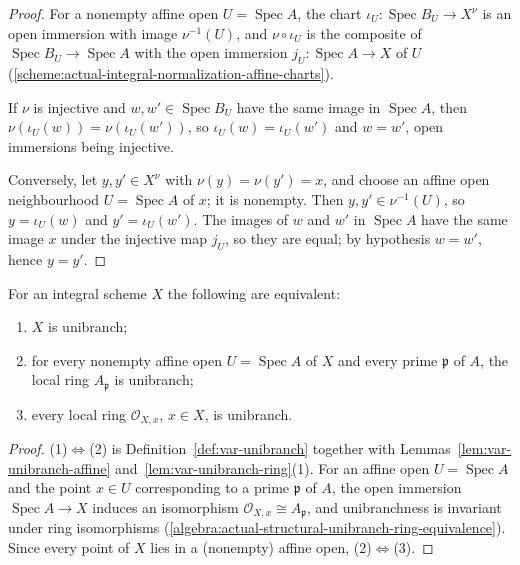 \begin{proof}
For a nonempty affine open $U=\operatorname{Spec}A$, the chart
$\iota_U\colon\operatorname{Spec}B_U\to X^\nu$ is an open immersion with image $\nu^{-1}(U)$, and
$\nu\circ\iota_U$ is the composite of $\operatorname{Spec}B_U\to\operatorname{Spec}A$ with the open
immersion $j_U\colon\operatorname{Spec}A\to X$ of $U$
(\ref{scheme:actual-integral-normalization-affine-charts}).

If $\nu$ is injective and $w,w'\in\operatorname{Spec}B_U$ have the same image in
$\operatorname{Spec}A$, then $\nu(\iota_U(w))=\nu(\iota_U(w'))$, so $\iota_U(w)=\iota_U(w')$ and
$w=w'$, open immersions being injective.

Conversely, let $y,y'\in X^\nu$ with $\nu(y)=\nu(y')=x$, and choose an affine open neighbourhood
$U=\operatorname{Spec}A$ of $x$; it is nonempty. Then $y,y'\in\nu^{-1}(U)$, so $y=\iota_U(w)$ and
$y'=\iota_U(w')$. The images of $w$ and $w'$ in $\operatorname{Spec}A$ have the same image $x$
under the injective map $j_U$, so they are equal; by hypothesis $w=w'$, hence $y=y'$.
\end{proof}

\begin{lemma}\label{lem:var-unibranch-stalks}
\leanok
{}
For an integral scheme $X$ the following are equivalent:
\begin{enumerate}
\item $X$ is unibranch;
\item for every nonempty affine open $U=\operatorname{Spec}A$ of $X$ and every prime
  $\mathfrak p$ of $A$, the local ring $A_{\mathfrak p}$ is unibranch;
\item every local ring $\mathcal O_{X,x}$, $x\in X$, is unibranch.
\end{enumerate}
\end{lemma}

\begin{proof}
(1)$\Leftrightarrow$(2) is Definition~\ref{def:var-unibranch} together with
Lemmas~\ref{lem:var-unibranch-affine} and~\ref{lem:var-unibranch-ring}(1). For an affine open
$U=\operatorname{Spec}A$ and the point $x\in U$ corresponding to a prime $\mathfrak p$ of $A$,
the open immersion $\operatorname{Spec}A\to X$ induces an isomorphism
$\mathcal O_{X,x}\cong A_{\mathfrak p}$, and unibranchness is invariant under ring isomorphisms
(\ref{algebra:actual-structural-unibranch-ring-equivalence}). Since every point of $X$ lies in a
(nonempty) affine open, (2)$\Leftrightarrow$(3).
\end{proof}

